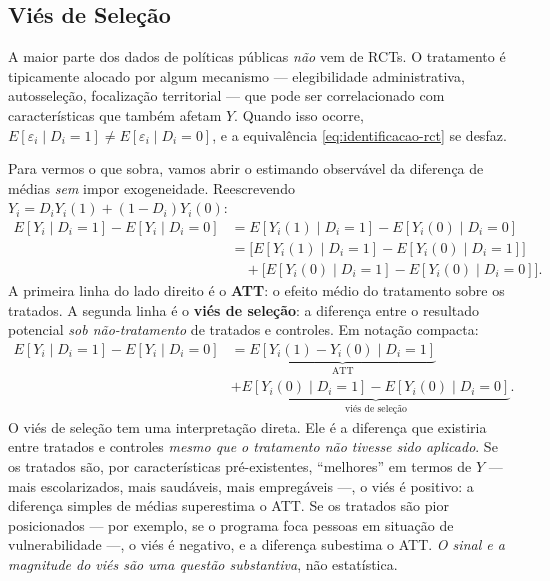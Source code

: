 \subsection{Viés de Seleção}
\label{subsubsec:vies-selecao}

A maior parte dos dados de políticas públicas \textit{não} vem de RCTs. O tratamento é tipicamente alocado por algum mecanismo --- elegibilidade administrativa, autosseleção, focalização territorial --- que pode ser correlacionado com características que também afetam $Y$. Quando isso ocorre, $E[\varepsilon_i \mid D_i = 1] \neq E[\varepsilon_i \mid D_i = 0]$, e a equivalência \eqref{eq:identificacao-rct} se desfaz.

Para vermos o que sobra, vamos abrir o estimando observável da diferença de médias \textit{sem} impor exogeneidade. Reescrevendo $Y_i = D_i Y_i(1) + (1 - D_i) Y_i(0)$:
\begin{align}
E[Y_i \mid D_i = 1] - E[Y_i \mid D_i = 0]
  &= E[Y_i(1) \mid D_i = 1] - E[Y_i(0) \mid D_i = 0] \nonumber \\
  &= \big[ E[Y_i(1) \mid D_i = 1] - E[Y_i(0) \mid D_i = 1] \big] \nonumber \\
  &\quad + \big[ E[Y_i(0) \mid D_i = 1] - E[Y_i(0) \mid D_i = 0] \big]. \label{eq:dec-vies}
\end{align}
A primeira linha do lado direito é o \textbf{ATT}: o efeito médio do tratamento sobre os tratados. A segunda linha é o \textbf{viés de seleção}: a diferença entre o resultado potencial \textit{sob não-tratamento} de tratados e controles. Em notação compacta:
\begin{align}
E[Y_i \mid D_i = 1] - E[Y_i \mid D_i = 0]
&= \underbrace{E[Y_i(1) - Y_i(0) \mid D_i = 1]}_{\text{ATT}} \nonumber \\ 
&+ \underbrace{E[Y_i(0) \mid D_i = 1] - E[Y_i(0) \mid D_i = 0]}_{\text{viés de seleção}}.
\label{eq:ATT-mais-vies}
\end{align}
O viés de seleção tem uma interpretação direta. Ele é a diferença que existiria entre tratados e controles \textit{mesmo que o tratamento não tivesse sido aplicado}. Se os tratados são, por características pré-existentes, ``melhores'' em termos de $Y$ --- mais escolarizados, mais saudáveis, mais empregáveis ---, o viés é positivo: a diferença simples de médias superestima o ATT. Se os tratados são pior posicionados --- por exemplo, se o programa foca pessoas em situação de vulnerabilidade ---, o viés é negativo, e a diferença subestima o ATT. \textit{O sinal e a magnitude do viés são uma questão substantiva}, não estatística.

